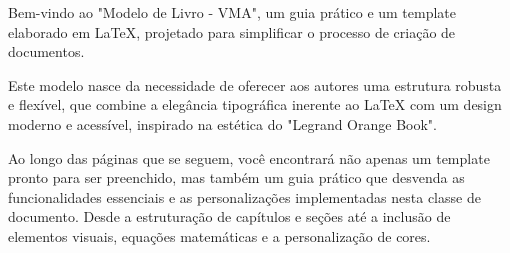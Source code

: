 Bem-vindo ao "Modelo de Livro - VMA", um guia prático e um template elaborado em LaTeX, projetado para simplificar o processo de criação de documentos.

Este modelo nasce da necessidade de oferecer aos autores uma estrutura robusta e flexível, que combine a elegância tipográfica inerente ao LaTeX com um design moderno e acessível, inspirado na estética do "Legrand Orange Book".

Ao longo das páginas que se seguem, você encontrará não apenas um template pronto para ser preenchido, mas também um guia prático que desvenda as funcionalidades essenciais e as personalizações implementadas nesta classe de documento. Desde a estruturação de capítulos e seções até a inclusão de elementos visuais, equações matemáticas e a personalização de cores.

\setcounter{tocdepth}{0}
\tableofcontents %